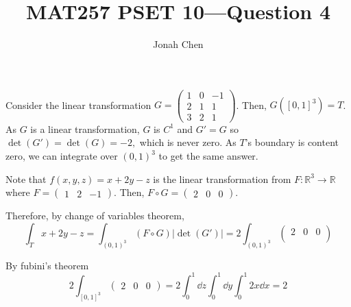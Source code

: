 \documentclass{exam}
\title{MAT257 PSET 10---Question 4}
\author{Jonah Chen}
\date{}
\numberwithin{equation}{section}
\newcommand{\R}{\mathbb{R}}
\begin{document}
    \sffamily
    \maketitle
    Consider the linear transformation \(G=\begin{pmatrix}
    1 & 0 & -1 \\
    2 & 1 & 1 \\
    3 & 2 & 1
    \end{pmatrix}\). Then, \(G([0,1]^3)=T\). As \(G\) is a linear transformation, \(G\) is \(C^1\) and \(G'=G\) so \(\det(G')=\det(G)=-2,\) which is never zero. As \(T\)'s boundary is content zero, we can integrate over \((0,1)^3\) to get the same answer.
    
    Note that \(f(x,y,z)=x+2y-z\) is the linear transformation from \(F:\R^3\to\R\) where \(F=\begin{pmatrix}
        1 & 2 & -1
    \end{pmatrix}\). Then, \(F\circ G=\begin{pmatrix}2 & 0 & 0\end{pmatrix}\).
    
    Therefore, by change of variables theorem,
    \[\int_Tx+2y-z=\int_{(0,1)^3}(F\circ G)|\det(G')|=2\int_{(0,1)^3}\begin{pmatrix}
        2 & 0 & 0 \\
    \end{pmatrix}\]

    By fubini's theorem
    \[2\int_{[0,1]^3}\begin{pmatrix}
        2 & 0 & 0
    \end{pmatrix}=2\int_0^1\dd z\int_0^1\dd y\int_0^1 2x\dd x=2\]
\end{document}
